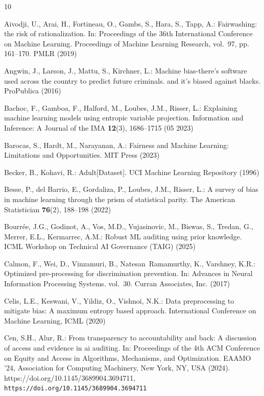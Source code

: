 \documentclass[runningheads, orivec]{llncs}
\begin{document}
\begin{thebibliography}{10}
\providecommand{\url}[1]{\texttt{#1}}
\providecommand{\urlprefix}{URL }
\providecommand{\doi}[1]{https://doi.org/#1}

Aivodji, U., Arai, H., Fortineau, O., Gambs, S., Hara, S., Tapp, A.: Fairwashing: the risk of rationalization. In: Proceedings of the 36th International Conference on Machine Learning. Proceedings of Machine Learning Research, vol.~97, pp. 161--170. PMLR (2019)

Angwin, J., Larson, J., Mattu, S., Kirchner, L.: Machine bias-there’s software used across the country to predict future criminals. and it’s biased against blacks. ProPublica  (2016)

Bachoc, F., Gamboa, F., Halford, M., Loubes, J.M., Risser, L.: Explaining machine learning models using entropic variable projection. Information and Inference: A Journal of the IMA  \textbf{12}(3),  1686--1715 (05 2023)

Barocas, S., Hardt, M., Narayanan, A.: Fairness and Machine Learning: Limitations and Opportunities. MIT Press (2023)

Becker, B., Kohavi, R.: {Adult[Dataset]}. UCI Machine Learning Repository (1996)

Besse, P., del Barrio, E., Gordaliza, P., Loubes, J.M., Risser, L.: A survey of bias in machine learning through the prism of statistical parity. The American Statistician  \textbf{76}(2),  188--198 (2022)

Bourr{\'e}e, J.G., Godinot, A., Vos, M.D., Vujasinovic, M., Biswas, S., Tredan, G., Merrer, E.L., Kermarrec, A.M.: Robust {ML} auditing using prior knowledge. ICML Workshop on Technical AI Governance (TAIG)  (2025)

Calmon, F., Wei, D., Vinzamuri, B., Natesan~Ramamurthy, K., Varshney, K.R.: Optimized pre-processing for discrimination prevention. In: Advances in Neural Information Processing Systems. vol.~30. Curran Associates, Inc. (2017)

Celis, L.E., Keswani, V., Yildiz, O., Vishnoi, N.K.: Data preprocessing to mitigate bias: A maximum entropy based approach. International Conference on Machine Learning, ICML  (2020)

Cen, S.H., Alur, R.: From transparency to accountability and back: A discussion of access and evidence in ai auditing. In: Proceedings of the 4th ACM Conference on Equity and Access in Algorithms, Mechanisms, and Optimization. EAAMO '24, Association for Computing Machinery, New York, NY, USA (2024). \doi{10.1145/3689904.3694711}, \url{https://doi.org/10.1145/3689904.3694711}


\end{thebibliography}
\end{document}
